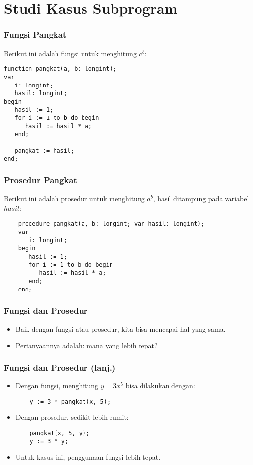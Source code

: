 \documentclass{beamer}
\begin{document}
\section{Studi Kasus Subprogram}
\frame{\sectionpage}

\begin{frame}[fragile]
\frametitle{Fungsi Pangkat}
Berikut ini adalah fungsi untuk menghitung $a^b$:
\begin{lstlisting}
function pangkat(a, b: longint);
var
   i: longint;
   hasil: longint;
begin
   hasil := 1;
   for i := 1 to b do begin
      hasil := hasil * a;
   end;
   
   pangkat := hasil;
end;	
\end{lstlisting}
\end{frame}

\begin{frame}[fragile]
\frametitle{Prosedur Pangkat}
Berikut ini adalah prosedur untuk menghitung $a^b$, hasil ditampung pada variabel $hasil$:
\begin{lstlisting}
	procedure pangkat(a, b: longint; var hasil: longint);
	var
	   i: longint;
	begin
	   hasil := 1;
	   for i := 1 to b do begin
	      hasil := hasil * a;
	   end;
	end;		
\end{lstlisting}
\end{frame}

\begin{frame}[fragile]
\frametitle{Fungsi dan Prosedur}
\begin{itemize}
	\item Baik dengan fungsi atau prosedur, kita bisa mencapai hal yang sama.
	\item Pertanyaannya adalah: \alert{mana yang lebih tepat}?
\end{itemize}
\end{frame}

\begin{frame}[fragile]
\frametitle{Fungsi dan Prosedur (lanj.)}
\begin{itemize}
	\item Dengan fungsi, menghitung $y = 3x^5$ bisa dilakukan dengan:
	\begin{lstlisting}
	y := 3 * pangkat(x, 5);
	\end{lstlisting}
	
	\item Dengan prosedur, sedikit lebih rumit:
	\begin{lstlisting}
	pangkat(x, 5, y);
	y := 3 * y;
	\end{lstlisting}
	
	\item Untuk kasus ini, \alert{penggunaan fungsi lebih tepat}.
\end{itemize}
\end{frame}
\end{document}
